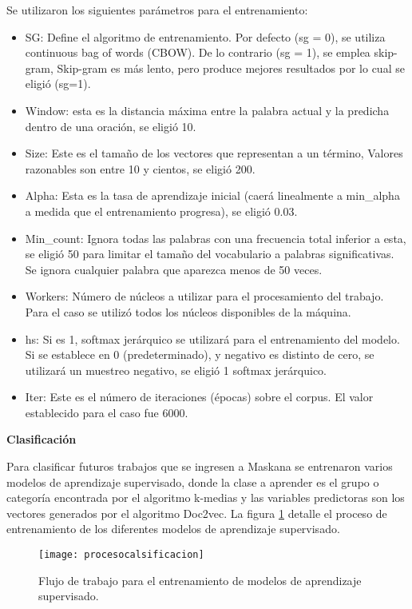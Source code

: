 Se utilizaron los siguientes parámetros para el entrenamiento:

\begin{itemize}
  \item	SG: Define el algoritmo de entrenamiento. Por defecto (sg = 0), se utiliza continuous bag of words (CBOW). De lo contrario (sg = 1), se emplea skip-gram, Skip-gram es más lento, pero produce mejores resultados por lo cual se eligió (sg=1).
  \item	Window: esta es la distancia máxima entre la palabra actual y la predicha dentro de una oración, se eligió 10.
  \item	Size: Este es el tamaño de los vectores que representan a un término, Valores razonables son entre 10 y cientos, se eligió 200.
  \item	Alpha: Esta es la tasa de aprendizaje inicial (caerá linealmente a min\_alpha a medida que el entrenamiento progresa), se eligió 0.03.
  \item	Min\_count: Ignora todas las palabras con una frecuencia total inferior a esta, se eligió 50 para limitar el tamaño del vocabulario a palabras significativas. Se ignora cualquier palabra que aparezca menos de 50 veces.
  \item	Workers: Número de núcleos a utilizar para el procesamiento del trabajo. Para el caso se utilizó todos los núcleos disponibles de la máquina.
  \item	hs: Si es 1, softmax jerárquico se utilizará para el entrenamiento del modelo. Si se establece en 0 (predeterminado), y negativo es distinto de cero, se utilizará un muestreo negativo, se eligió 1 softmax jerárquico.
  \item	Iter: Este es el número de iteraciones (épocas) sobre el corpus. El valor establecido para el caso fue 6000.
\end{itemize}

\textbf{Clasificación}

Para clasificar futuros trabajos que se ingresen a Maskana se entrenaron varios modelos de aprendizaje supervisado, donde la clase a aprender es el grupo o categoría encontrada por el algoritmo k-medias y las variables predictoras son los vectores generados por el algoritmo Doc2vec.
La figura \ref{fig:procesocalsificacion} detalle el proceso de entrenamiento de los diferentes modelos de aprendizaje supervisado.


\begin{figure}[H]
\texttt{[image: procesocalsificacion]}
\caption{Flujo de trabajo para el entrenamiento de modelos de aprendizaje supervisado.}
\label{fig:procesocalsificacion}
\end{figure}

